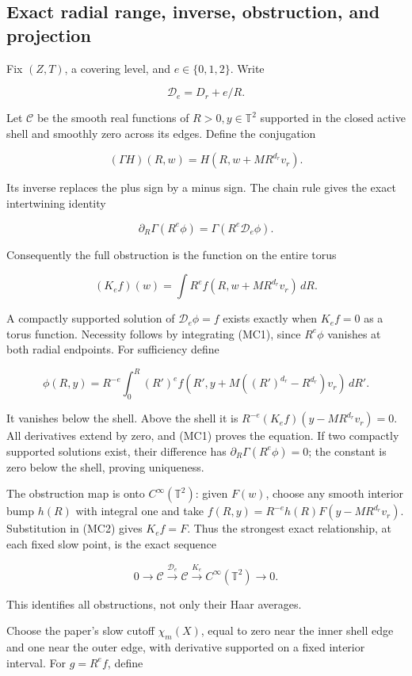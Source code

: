 \documentclass[10pt,a4paper]{article}
\begin{document}
\subsection{Exact radial range, inverse, obstruction, and projection}

Fix \((Z,T)\), a covering level, and \(e\in\{0,1,2\}\). Write

\[
\mathcal D_e=D_r+e/R.
\]

Let \(\mathcal C\) be the smooth real functions of \(R>0,y\in\mathbb T^2\) supported in the closed active shell and smoothly zero across its edges. Define the conjugation

\[
(\Gamma H)(R,w)=H(R,w+MR^{d_r}v_r).
\]

Its inverse replaces the plus sign by a minus sign. The chain rule gives the exact intertwining identity

\[
\partial_R\Gamma(R^e\phi)=\Gamma(R^e\mathcal D_e\phi).
\tag{MC1}
\]

Consequently the full obstruction is the function on the entire torus

\[
(K_ef)(w)=\int R^ef(R,w+MR^{d_r}v_r)\,dR.
\tag{MC2}
\]

A compactly supported solution of \(\mathcal D_e\phi=f\) exists exactly when \(K_ef=0\) as a torus function. Necessity follows by integrating (MC1), since \(R^e\phi\) vanishes at both radial endpoints. For sufficiency define

\[
\phi(R,y)=R^{-e}\int_0^R(R')^e
f(R',y+M((R')^{d_r}-R^{d_r})v_r)\,dR'.
\tag{MC3}
\]

It vanishes below the shell. Above the shell it is \(R^{-e}(K_ef)(y-MR^{d_r}v_r)=0\). All derivatives extend by zero, and (MC1) proves the equation. If two compactly supported solutions exist, their difference has \(\partial_R\Gamma(R^e\phi)=0\); the constant is zero below the shell, proving uniqueness.

The obstruction map is onto \(C^\infty(\mathbb T^2)\): given \(F(w)\), choose any smooth interior bump \(h(R)\) with integral one and take \(f(R,y)=R^{-e}h(R)F(y-MR^{d_r}v_r)\). Substitution in (MC2) gives \(K_ef=F\). Thus the strongest exact relationship, at each fixed slow point, is the exact sequence

\[
0\longrightarrow\mathcal C
\xrightarrow{\mathcal D_e}\mathcal C
\xrightarrow{K_e}C^\infty(\mathbb T^2)
\longrightarrow0.
\tag{MC4}
\]

This identifies all obstructions, not only their Haar averages.

Choose the paper's slow cutoff \(\chi_m(X)\), equal to zero near the inner shell edge and one near the outer edge, with derivative supported on a fixed interior interval. For \(g=R^ef\), define
\end{document}
